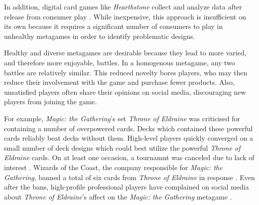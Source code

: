 In addition, digital card games like \textit{Hearthstone} collect and
analyze data after release from consumer play
\cite{blizzard-gamebalancetalk-keg2019}. While inexpensive, this
approach is insufficient on its own because it requires a significant
number of consumers to play in unhealthy metagames in order to
identify problematic designs.


Healthy and diverse metagames are desirable because they lead to more
varied, and therefore more enjoyable, battles. In a homogenous
metagame, any two battles are relatively similar. This reduced novelty
bores players, who may then reduce their involvement with the game and
purchase fewer products. Also, unsatisfied players often share their
opinions on social media, discouraging new players from joining the
game.


For example, \textit{Magic: the Gathering}'s set \textit{Throne of
  Eldraine} was criticised for containing a number of overpowered
cards. Decks which contained these powerful cards reliably beat decks
without them. High-level players quickly converged on a small number
of deck designs which could best utilize the powerful \textit{Throne
  of Eldraine} cards. On at least one occasion, a tournamnt was
canceled due to lack of interest \cite{oko-meta-drama}. Wizards of the
Coast, the company responsible for \textit{Magic: the Gathering},
banned a total of six cards from \textit{Throne of Eldraine} in
response \cite{mtg-banlist, mtg-bnr-nov-2019, mtg-bnr-jun-2020,
  mtg-bnr-aug-2020}. Even after the bans, high-profile professional
players have complained on social media about \textit{Throne of
  Eldraine}'s affect on the \textit{Magic: the Gathering} metagame
\cite{lsv-eldraine-complaints}.


